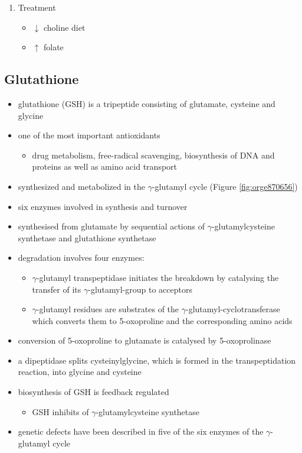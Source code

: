 \documentclass{scrartcl}
\begin{document}
\begin{enumerate}
\item Treatment
\label{sec:org80ddc31}
\begin{itemize}
\item \(\downarrow\) choline diet
\item \(\uparrow\) folate
\end{itemize}
\end{enumerate}

\subsection{Glutathione}
\label{sec:org3f3f3d3}
\begin{itemize}
\item glutathione (GSH) is a tripeptide consisting of glutamate, cysteine and glycine
\item one of the most important antioxidants
\begin{itemize}
\item drug metabolism, free-radical scavenging, biosynthesis of DNA and
proteins as well as amino acid transport
\end{itemize}
\item synthesized and metabolized in the \(\gamma\)-glutamyl cycle (Figure
\ref{fig:orge870656})
\item six enzymes involved in synthesis and turnover
\item synthesised from glutamate by sequential actions of
\(\gamma\)-glutamylcysteine synthetase and glutathione
synthetase
\item degradation involves four enzymes:
\begin{itemize}
\item \(\gamma\)-glutamyl transpeptidase initiates the breakdown by
catalysing the transfer of its \(\gamma\)-glutamyl-group to
acceptors
\item \(\gamma\)-glutamyl residues are substrates of the
\(\gamma\)-glutamyl-cyclotransferase which converts them to
5-oxoproline and the corresponding amino acids
\end{itemize}
\item conversion of 5-oxoproline to glutamate is catalysed by
5-oxoprolinase
\item a dipeptidase splits cysteinylglycine, which is formed in the
transpeptidation reaction, into glycine and cysteine
\item biosynthesis of GSH is feedback regulated
\begin{itemize}
\item GSH inhibits of \(\gamma\)-glutamylcysteine synthetase
\end{itemize}
\item genetic defects have been described in five of the six enzymes of
the \(\gamma\)-glutamyl cycle
\end{itemize}
\end{document}
